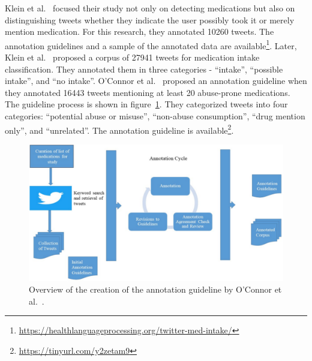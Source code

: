 Klein et al.~\cite{klein2017detecting} focused their study not only on detecting medications but also on distinguishing tweets whether they indicate the user possibly took it or merely mention medication. For this research, they annotated 10260 tweets. The annotation guidelines and a sample of the annotated data are available\footnote{\url{https://healthlanguageprocessing.org/twitter-med-intake/}}. Later, Klein et al.~\cite{klein2019analysis} proposed a corpus of 27941 tweets for medication intake classification. They annotated them in three categories - “intake”, “possible intake”, and “no intake”. O’Connor et al.~\cite{o2020promoting} proposed an annotation guideline when they annotated 16443 tweets mentioning at least 20 abuse-prone medications. The guideline process is shown in figure~\ref{fig:annotation-oconnor}. They categorized tweets into four categories: “potential abuse or misuse”, “non-abuse consumption”, “drug mention only”, and “unrelated”. The annotation guideline is available\footnote{\url{https://tinyurl.com/y2zetam9}}.

\begin{figure}[h]
	\centering
	\includegraphics[width=0.99\linewidth]{Figures/d.png}
	\caption{Overview of the creation of the annotation guideline by O’Connor et al.~\cite{o2020promoting}.}
	\label{fig:annotation-oconnor}
\end{figure}
